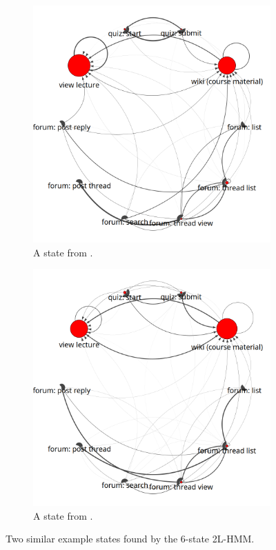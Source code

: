 \begin{figure}
  \centering
  \begin{subfigure}[t]{0.5\textwidth}
    \includegraphics[width=\textwidth]{figures/text-6state/state4.png}
    \caption{A state from \textretrieval{}.}
  \end{subfigure}%
  \begin{subfigure}[t]{0.5\textwidth}
    \includegraphics[width=\textwidth]{figures/sustain-6state/state4.png}
    \caption{A state from \sustain{}.}
  \end{subfigure}
  \caption{Two similar example states found by the 6-state 2L-HMM.}
  \label{fig:cross-course}
\end{figure}

